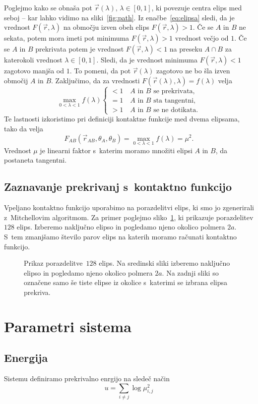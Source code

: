 \noindent Poglejmo kako se obnaša pot $\vec{r}(\lambda), \, \lambda \in [0,1]$, ki povezuje 
centra elips med seboj -- kar lahko vidimo na sliki~\ref{fig:path}.
Iz enačbe~\ref{eq:elipsa} sledi, da je vrednost $F(\vec{r}, \lambda)$ na območju 
izven obeh elips $F(\vec{r}, \lambda)>1$. Če se $A$ in $B$ ne sekata, potem mora imeti 
pot minimuma $F(\vec{r}, \lambda)>1$ vrednost večjo od $1$. Če se $A$ in $B$ prekrivata 
potem je vrednost $F(\vec{r}, \lambda)<1$ na preseku $A \cap B$ za katerokoli vrednost 
$\lambda \in [0,1]$.  Sledi, da je vrednost minimuma $F(\vec{r}, \lambda)<1$ zagotovo 
manjša od $1$. To pomeni, da pot $\vec{r}(\lambda)$ zagotovo ne bo šla izven območij
$A$ in $B$. Zaključimo, da za vrednosti $F(\vec{r}(\lambda), \lambda) = 
f(\lambda)$ velja
\begin{equation}
    \max_{0<\lambda<1} f(\lambda)
    \begin{cases}
        <1 \quad\text{$A$ in $B$ se prekrivata,}\\
        =1 \quad\text{$A$ in $B$ sta tangentni,}\\
        >1 \quad\text{$A$ in $B$ se ne dotikata.}
    \end{cases}
    \label{eq:kriterij}
\end{equation}
Te lastnosti izkoristimo pri definiciji kontaktne funkcije med dvema elipsama, tako da
velja
\begin{equation}
    F_{A B}(\vec{r}_{A B}, \theta_A, \theta_B) =
    \max_{0<\lambda<1} f(\lambda) = \mu^2.
    \label{eq:kontakt}
\end{equation}
Vrednost $\mu$ je linearni faktor s~katerim moramo množiti elipsi $A$ in $B$, da 
postaneta tangentni.
\subsection{Zaznavanje prekrivanj s~kontaktno funkcijo}
Vpeljano kontaktno funkcijo uporabimo na porazdelitvi elips, ki smo jo zgenerirali
z~Mitchellovim algoritmom. 
Za primer poglejmo sliko~\ref{fig:zaznavanje_trkov}, ki prikazuje porazdelitev
$128$ elips. Izberemo naključno elipso in pogledamo njeno okolico polmera $2a$.
S~tem zmanjšamo število parov elips na katerih moramo računati kontaktno funkcijo.
\begin{figure}[!ht]
    \centering
    \resizebox{.32\textwidth}{!}{}
    \resizebox{.32\textwidth}{!}{}
    \resizebox{.32\textwidth}{!}{}
    \caption{Prikaz porazdelitve~$128$ elips.
    Na sredinski sliki izberemo naključno elipso in pogledamo njeno okolico polmera 
    $2a$. Na zadnji sliki so označene samo še tiste elipse iz okolice s~katerimi 
    se izbrana elipsa prekriva.}
    \label{fig:zaznavanje_trkov}
\end{figure}

\section{Parametri sistema}
\subsection{Energija}
Sistemu definiramo prekrivalno enrgijo na sledeč način
\begin{equation}
    u = \sum_{i \neq j} \log{\mu_{i,j}^2} 
\end{equation}